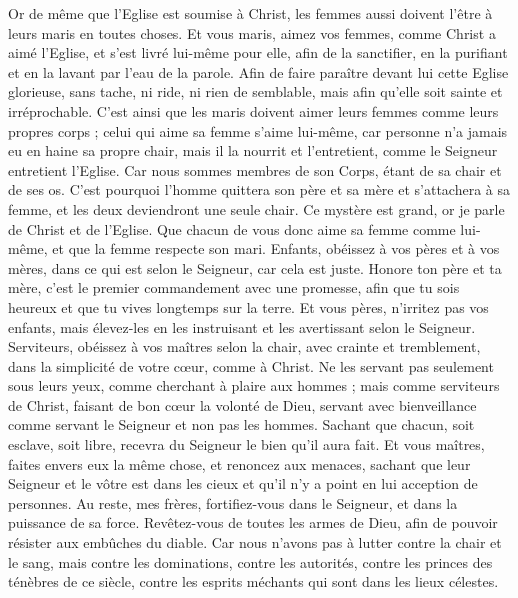\begin{multicols}{2}
Or de même que l'Eglise est soumise à Christ, les femmes aussi doivent l'être à leurs maris en toutes choses.
Et vous maris, aimez vos femmes, comme Christ a aimé l'Eglise, et s'est livré lui-même pour elle,
afin de la sanctifier, en la purifiant et en la lavant par l'eau de la parole.
Afin de faire paraître devant lui cette Eglise glorieuse, sans tache, ni ride, ni rien de semblable, mais afin qu'elle soit sainte et irréprochable.
C'est ainsi que les maris doivent aimer leurs femmes comme leurs propres corps ; celui qui aime sa femme s'aime lui-même,
car personne n'a jamais eu en haine sa propre chair, mais il la nourrit et l'entretient, comme le Seigneur entretient l'Eglise.
Car nous sommes membres de son Corps, étant de sa chair et de ses os.
C'est pourquoi l'homme quittera son père et sa mère et s'attachera à sa femme, et les deux deviendront une seule chair.
Ce mystère est grand, or je parle de Christ et de l'Eglise.
Que chacun de vous donc aime sa femme comme lui-même, et que la femme respecte son mari.
\VerseOne{}Enfants, obéissez à vos pères et à vos mères, dans ce qui est selon le Seigneur, car cela est juste.
Honore ton père et ta mère, c'est le premier commandement avec une promesse,
afin que tu sois heureux et que tu vives longtemps sur la terre.
Et vous pères, n'irritez pas vos enfants, mais élevez-les en les instruisant et les avertissant selon le Seigneur.
Serviteurs, obéissez à vos maîtres selon la chair, avec crainte et tremblement, dans la simplicité de votre cœur, comme à Christ.
Ne les servant pas seulement sous leurs yeux, comme cherchant à plaire aux hommes ; mais comme serviteurs de Christ, faisant de bon cœur la volonté de Dieu,
servant avec bienveillance comme servant le Seigneur et non pas les hommes.
Sachant que chacun, soit esclave, soit libre, recevra du Seigneur le bien qu'il aura fait.
Et vous maîtres, faites envers eux la même chose, et renoncez aux menaces, sachant que leur Seigneur et le vôtre est dans les cieux et qu'il n'y a point en lui acception de personnes.
Au reste, mes frères, fortifiez-vous dans le Seigneur, et dans la puissance de sa force.
Revêtez-vous de toutes les armes de Dieu, afin de pouvoir résister aux embûches du diable.
Car nous n'avons pas à lutter contre la chair et le sang, mais contre les dominations, contre les autorités, contre les princes des ténèbres de ce siècle, contre les esprits méchants qui sont dans les lieux célestes.

\end{multicols}

